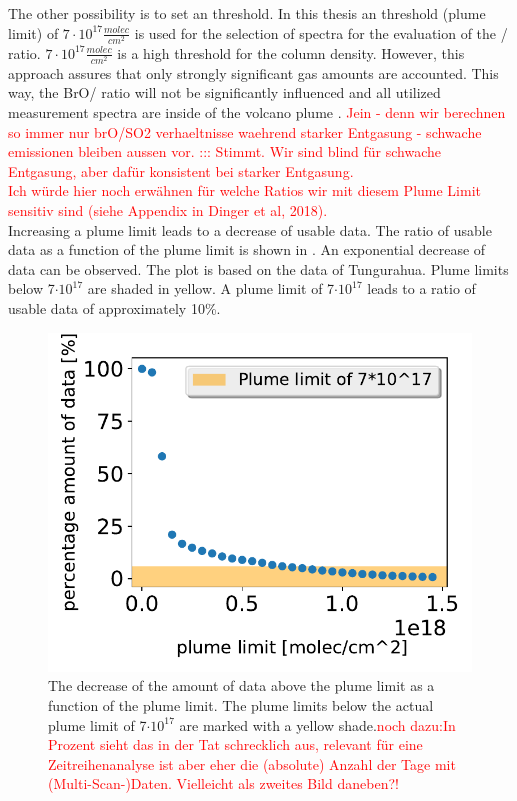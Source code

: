 The other possibility is to set an  threshold. In this thesis an  threshold (plume limit) of $7\cdot 10^{17} \frac{molec}{cm^2}$ is used for the selection of spectra for the evaluation of the / ratio. $7\cdot 10^{17} \frac{molec}{cm^2}$ is a high threshold for the column density. However, this approach assures that only strongly significant gas amounts are accounted. This way, the BrO/ ratio will not be significantly influenced and all utilized measurement spectra are inside of the volcano plume \citep{lubcke2014bro}. \textcolor{red}{Jein - denn wir berechnen so immer nur brO/SO2 verhaeltnisse waehrend starker Entgasung - schwache emissionen bleiben aussen vor.   ::: Stimmt. Wir sind blind für schwache Entgasung, aber dafür konsistent bei starker Entgasung.}\\
\textcolor{red}{Ich würde hier noch erwähnen für welche Ratios wir mit diesem Plume Limit sensitiv sind (siehe Appendix in Dinger et al, 2018).}\\
Increasing a plume limit leads to a decrease of usable data. The ratio of usable  data as a function of the plume limit is shown in . An exponential decrease of data can be observed. The plot is based on the data of Tungurahua. Plume limits below 7$\cdot10^{17}$ are shaded in yellow. A plume limit of 7$\cdot10^{17}$ leads to a ratio of usable data of approximately 10\%.
\begin{figure}
	\centering
	\includegraphics[width=0.7\linewidth]{Bilder/percentage_minSO2}
	\caption{The decrease of the amount of data above the plume limit as a function of the plume limit. The plume limits below the actual plume limit of 7$\cdot10^{17}$ are marked with a yellow shade.\textcolor{red}{noch dazu:In Prozent sieht das in der Tat schrecklich aus, relevant für eine Zeitreihenanalyse ist aber eher die (absolute) Anzahl der Tage mit (Multi-Scan-)Daten. Vielleicht als zweites Bild daneben?! }}
	\label{fig:percentageminso2}
\end{figure}

